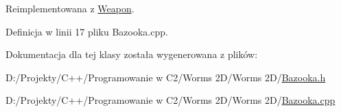 Reimplementowana z \mbox{\hyperlink{class_weapon_aaf32c85f3e70d3c8392c928b9e6e75ca}{Weapon}}.



Definicja w linii 17 pliku Bazooka.\+cpp.



Dokumentacja dla tej klasy została wygenerowana z plików\+:\begin{DoxyCompactItemize}
\item 
D\+:/\+Projekty/\+C++/\+Programowanie w C2/\+Worms 2\+D/\+Worms 2\+D/\mbox{\hyperlink{_bazooka_8h}{Bazooka.\+h}}\item 
D\+:/\+Projekty/\+C++/\+Programowanie w C2/\+Worms 2\+D/\+Worms 2\+D/\mbox{\hyperlink{_bazooka_8cpp}{Bazooka.\+cpp}}\end{DoxyCompactItemize}
